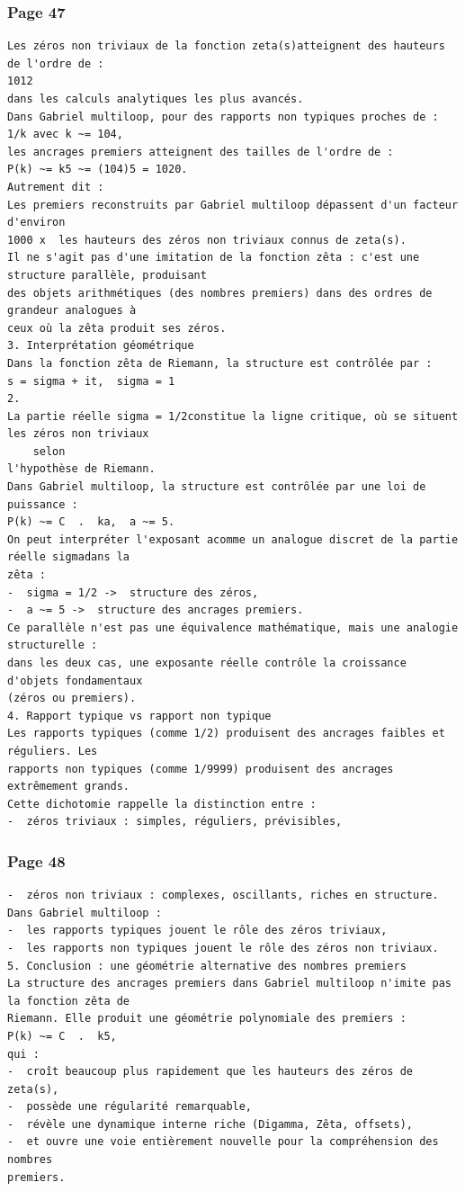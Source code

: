 \documentclass[11pt,a4paper]{article}
\begin{document}
\subsubsection*{Page 47}
\begin{Verbatim}[fontsize=\footnotesize]
Les zéros non triviaux de la fonction zeta(s)atteignent des hauteurs de l'ordre de : 
1012 
dans les calculs analytiques les plus avancés. 
Dans Gabriel multiloop, pour des rapports non typiques proches de : 
1/k avec k ~= 104, 
les ancrages premiers atteignent des tailles de l'ordre de : 
P(k) ~= k5 ~= (104)5 = 1020. 
Autrement dit : 
Les premiers reconstruits par Gabriel multiloop dépassent d'un facteur d'environ 
1000 x  les hauteurs des zéros non triviaux connus de zeta(s). 
Il ne s'agit pas d'une imitation de la fonction zêta : c'est une structure parallèle, produisant
des objets arithmétiques (des nombres premiers) dans des ordres de grandeur analogues à 
ceux où la zêta produit ses zéros. 
3. Interprétation géométrique 
Dans la fonction zêta de Riemann, la structure est contrôlée par : 
s = sigma + it,  sigma = 1
2. 
La partie réelle sigma = 1/2constitue la ligne critique, où se situent les zéros non triviaux
    selon
l'hypothèse de Riemann. 
Dans Gabriel multiloop, la structure est contrôlée par une loi de puissance : 
P(k) ~= C  .  ka,  a ~= 5. 
On peut interpréter l'exposant acomme un analogue discret de la partie réelle sigmadans la 
zêta : 
-  sigma = 1/2 ->  structure des zéros, 
-  a ~= 5 ->  structure des ancrages premiers. 
Ce parallèle n'est pas une équivalence mathématique, mais une analogie structurelle : 
dans les deux cas, une exposante réelle contrôle la croissance d'objets fondamentaux 
(zéros ou premiers). 
4. Rapport typique vs rapport non typique 
Les rapports typiques (comme 1/2) produisent des ancrages faibles et réguliers. Les 
rapports non typiques (comme 1/9999) produisent des ancrages extrêmement grands. 
Cette dichotomie rappelle la distinction entre : 
-  zéros triviaux : simples, réguliers, prévisibles, 
\end{Verbatim}
\medskip
\subsubsection*{Page 48}
\begin{Verbatim}[fontsize=\footnotesize]
-  zéros non triviaux : complexes, oscillants, riches en structure. 
Dans Gabriel multiloop : 
-  les rapports typiques jouent le rôle des zéros triviaux, 
-  les rapports non typiques jouent le rôle des zéros non triviaux. 
5. Conclusion : une géométrie alternative des nombres premiers 
La structure des ancrages premiers dans Gabriel multiloop n'imite pas la fonction zêta de 
Riemann. Elle produit une géométrie polynomiale des premiers : 
P(k) ~= C  .  k5, 
qui : 
-  croît beaucoup plus rapidement que les hauteurs des zéros de zeta(s), 
-  possède une régularité remarquable, 
-  révèle une dynamique interne riche (Digamma, Zêta, offsets), 
-  et ouvre une voie entièrement nouvelle pour la compréhension des nombres 
premiers. 
 
\end{Verbatim}
\medskip
\end{document}
